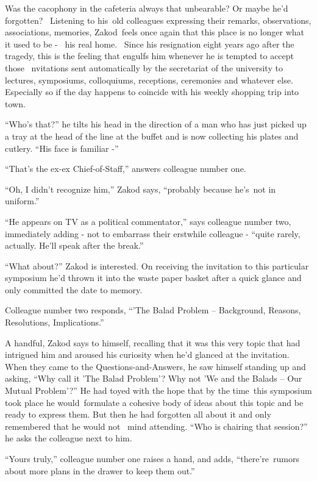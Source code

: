 \documentclass[twoside,11pt]{book}
\begin{document}
Was the cacophony in the cafeteria always that unbearable? Or maybe he'd forgotten? ~Listening to his~old colleagues
expressing their remarks, observations, associations, memories, Zakod~feels once again that this place is no longer
what it used to be -~ his real home. ~Since his resignation eight years ago after the tragedy, this is the feeling that
engulfs him whenever he is tempted to accept those \ nvitations sent automatically by the secretariat of the university
to lectures, symposiums, colloquiums, receptions, ceremonies and whatever else. Especially so if the day happens to
coincide with his weekly shopping trip into town.

``Who's that?'' he tilts his head in the direction of a man who has just picked up a tray at
the head of the line at the buffet and is now collecting his plates and cutlery. ``His face is familiar
-''

``That's the ex-ex Chief-of-Staff,'' answers colleague number one.

``Oh, I didn't recognize him,'' Zakod says, ``probably because he's~not in
uniform.'' ~

``He appears on TV as a political commentator,'' says colleague number two, immediately adding
- not to embarrass their erstwhile colleague - ``quite rarely, actually. He'll speak after the
break.''

``What about?'' Zakod is interested. On receiving the invitation to this particular symposium
he'd thrown it into the waste paper basket after a quick glance and only committed the date to memory.

Colleague number two responds, ``'The Balad Problem -- Background, Reasons, Resolutions,
Implications.''

A handful, Zakod says to himself, recalling that it was this very topic that had intrigued him and aroused his curiosity
when he'd glanced at the invitation. When they{ }came{ }to the
Questions-and-Answers{, }he saw himself standing up and asking, ``Why call it 'The Balad
Problem'? Why not 'We and the Balads -- Our Mutual Problem'?'' He had toyed with the hope that by the
time~this symposium{ }took place he would~formulate a cohesive body of ideas about this topic and be
ready to express them. But then he had forgotten all about it and only remembered that he would not \ mind attending.
``Who is chairing that session?'' he asks the colleague next to him.

``Yours truly,'' colleague number one raises a hand, and adds, ``there're~rumors
about more plans in the drawer to keep them out.''
\end{document}
